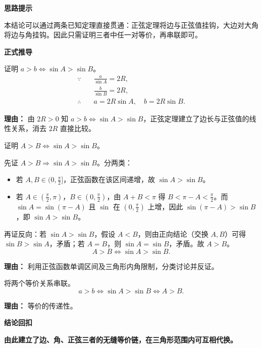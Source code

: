 \begin{proofbox}
	\textbf{\textcolor{CProof}{思路提示}}

	本结论可以通过两条已知定理直接贯通：正弦定理将边与正弦值挂钩，大边对大角将边与角挂钩。因此只需证明三者中任一对等价，再串联即可。

	\medskip
	\textbf{\textcolor{CProof}{正式推导}}
	\begin{description}[style=nextline, leftmargin=2.8em, labelsep=0.5em, itemsep=0.55em]
		\item[\textbf{步骤一（正弦定理转化）：}] 证明 $a>b\iff\sin A>\sin B$。
			\[
				\begin{aligned}
					\because \quad & \frac{a}{\sin A} = 2R,\\
					& \frac{b}{\sin B} = 2R,\\
					\therefore \quad & a = 2R\sin A,\quad b = 2R\sin B.
			\end{aligned}
			\]
			\par\textbf{理由：} 由 $2R>0$ 知 $a>b\iff\sin A>\sin B$，正弦定理建立了边长与正弦值的线性关系，消去 $2R$ 直接比较。

		\item[\textbf{步骤二（角度正相关）：}] 证明 $A>B\iff\sin A>\sin B$。

			先证 $A>B\Rightarrow\sin A>\sin B$。分两类：
			\begin{itemize}
			\item 若 $A,B\in(0,\frac{\pi}{2}]$，正弦函数在该区间递增，故 $\sin A>\sin B$。
			\item 若 $A\in(\frac{\pi}{2},\pi)$，$B\in(0,\frac{\pi}{2})$，由 $A+B<\pi$ 得 $B<\pi-A<\frac{\pi}{2}$。而 $\sin A=\sin(\pi-A)$ 且 $\sin$ 在 $(0,\frac{\pi}{2})$ 上增，因此 $\sin(\pi-A)>\sin B$，即 $\sin A>\sin B$。
		\end{itemize}
			再证反向：若 $\sin A>\sin B$，假设 $A<B$，则由正向结论（交换 $A,B$）可得 $\sin B>\sin A$，矛盾；若 $A=B$，则 $\sin A=\sin B$，矛盾。故 $A>B$。
			\[
				A>B\iff\sin A>\sin B.
			\]
			\par\textbf{理由：} 利用正弦函数单调区间及三角形内角限制，分类讨论并反证。

		\item[\textbf{步骤三（等价链合并）：}] 将两个等价关系串联。
			\[
				a>b\iff\sin A>\sin B\iff A>B.
			\]
			\par\textbf{理由：} 等价的传递性。
	\end{description}

	\medskip
	\textbf{\textcolor{CProof}{结论回扣}}

	\textbf{由此建立了边、角、正弦三者的无缝等价链，在三角形范围内可互相代换。}
\end{proofbox}
